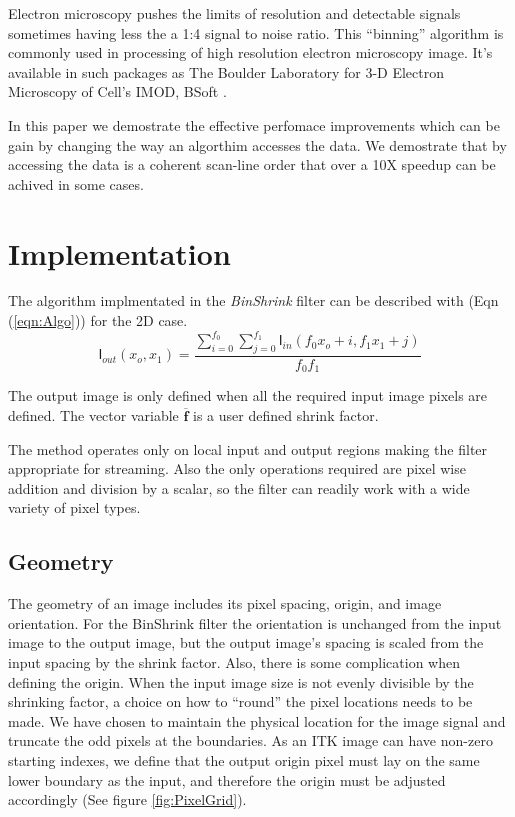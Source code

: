 \documentclass{InsightArticle}
\begin{document}
Electron microscopy  pushes the limits of resolution and detectable
signals sometimes having less the a 1:4 signal to noise ratio.
This ``binning'' algorithm is commonly used in processing of high
resolution electron microscopy image. It's available in such packages
as The Boulder Laboratory for 3-D Electron Microscopy of Cell's
IMOD\cite{IMOD}, BSoft \cite{bsoft2007}.

In this paper we demostrate the effective perfomace improvements which
can be gain by changing the way an algorthim accesses the data. We
demostrate that by accessing the data is a coherent scan-line order
that over a 10X speedup can be achived in some cases.

\section{Implementation}

The algorithm implmentated in the \textit{BinShrink} filter can be
described with (Eqn (\ref{eqn:Algo})) for the 2D case.
\begin{equation}
\label{eqn:Algo}
\mathsf{I}_{out}(x_o,x_1) = \frac{\sum_{i=0}^{f_0}\sum_{j=0}^{f_1}\mathsf{I}_{in}(f_0 x_o+i,f_1 x_1+j)}{f_0 f_1}
\end{equation}

The output image is only defined when all the required input image
pixels are defined. The vector variable $\mathbf{\overline{f}}$ is a user defined
shrink factor.

The method operates only on local input and output regions making the
filter appropriate for streaming. Also the only operations required are
pixel wise addition and division by a scalar, so the filter can readily
work with a wide variety of pixel types.

\subsection{Geometry}

The geometry of an image includes its pixel spacing, origin, and
image orientation. For the BinShrink filter the orientation is 
unchanged from the input image to the output image, but the output 
image's spacing is scaled from the input spacing by the shrink factor.
Also, there is some complication when defining the origin. When the input image size is
not evenly divisible by the shrinking factor, a choice on how to
``round'' the pixel locations needs to be made. We have chosen to maintain the physical
location for the image signal and truncate the odd pixels at the
boundaries. As an ITK image can have non-zero starting indexes, we define
that the output origin pixel must lay on the same lower boundary as the
input, and therefore the origin must be adjusted accordingly (See figure \ref{fig:PixelGrid}).
\end{document}
